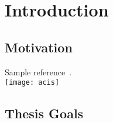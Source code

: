 \chapter{Introduction}

\section{Motivation}
Sample reference~\cite{Weng98}.\\
\texttt{[image: acis]}
\newpage

\section{Thesis Goals}

\blankpage
